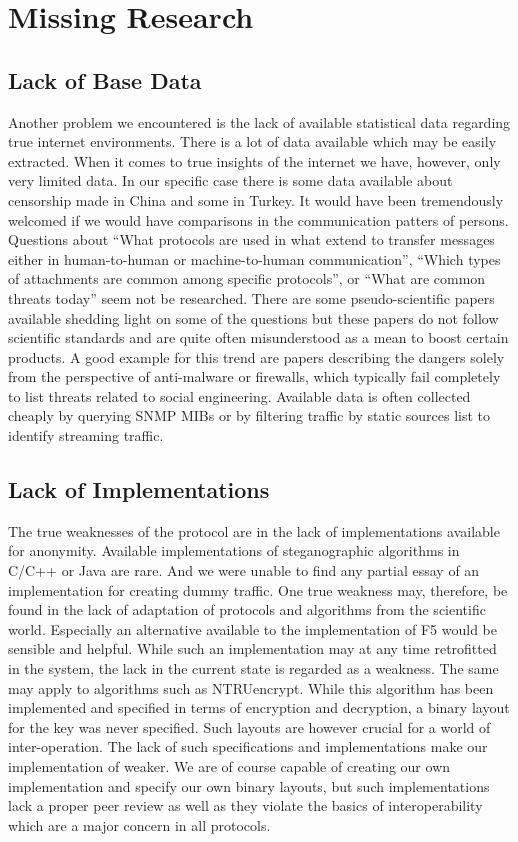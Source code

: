 \chapter{Missing Research}

\section{Lack of Base Data}

Another problem we encountered is the lack of available statistical data regarding true internet environments. There is a lot of data available which may be easily extracted. When it comes to true insights of the internet we have, however, only very limited data. In our specific case there is some data available about censorship made in China and some in Turkey. It would have been tremendously welcomed if we would have comparisons in the communication patters of persons. Questions about ``What protocols are used in what extend to transfer messages either in human-to-human or machine-to-human communication'', ``Which types of attachments are common among specific protocols'', or ``What are common threats today'' seem not be researched. There are some pseudo-scientific papers available shedding light on some of the questions but these papers do not follow scientific standards and are quite often misunderstood as a mean to boost certain products. A good example for this trend are papers describing the dangers solely from the perspective of anti-malware or firewalls, which typically fail completely to list threats related to social engineering. Available data is often collected cheaply by querying SNMP MIBs or by filtering traffic by static sources list to identify streaming traffic.

\section{Lack of Implementations}
The true weaknesses of the protocol are in the lack of implementations available for anonymity. Available implementations of steganographic algorithms in C/C++ or Java are rare. And we were unable to find any partial essay of an implementation for creating dummy traffic. One true weakness may, therefore, be found in the lack of adaptation of protocols and algorithms from the scientific world. Especially an alternative available to the implementation of F5 would be sensible and helpful. While such an implementation may at any time retrofitted in the system, the lack in the current state is regarded as a weakness. The same may apply to algorithms such as NTRUencrypt. While this algorithm has been implemented and specified in terms of encryption and decryption, a binary layout for the key was never specified. Such layouts are however crucial for a world of inter-operation. The lack of such specifications and implementations make our implementation of \MessageVortex{} weaker. We are of course capable of creating our own implementation and specify our own binary layouts, but such implementations lack a proper peer review as well as they violate the basics of interoperability which are a major concern in all protocols. 

